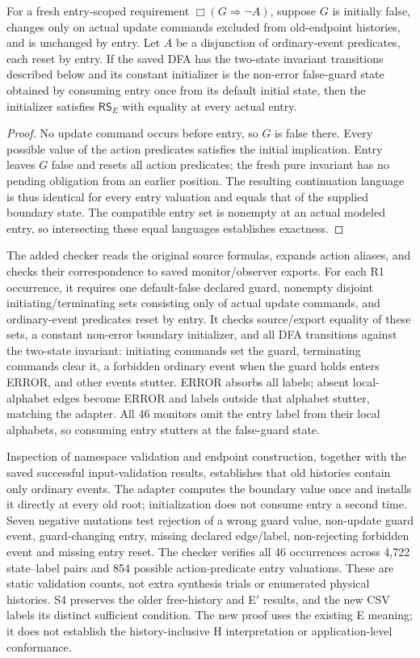 \begin{lemma}
\label{lem:r1-entry}
For a fresh entry-scoped requirement $\Box(G\Rightarrow\neg A)$, suppose $G$ is initially false, changes only on actual update commands excluded from old-endpoint histories, and is unchanged by entry. Let $A$ be a disjunction of ordinary-event predicates, each reset by entry. If the saved DFA has the two-state invariant transitions described below and its constant initializer is the non-error false-guard state obtained by consuming entry once from its default initial state, then the initializer satisfies $\mathsf{RS}_E$ with equality at every actual entry.
\end{lemma}
\begin{proof}
No update command occurs before entry, so $G$ is false there. Every possible value of the action predicates satisfies the initial implication. Entry leaves $G$ false and resets all action predicates; the fresh pure invariant has no pending obligation from an earlier position. The resulting continuation language is thus identical for every entry valuation and equals that of the supplied boundary state. The compatible entry set is nonempty at an actual modeled entry, so intersecting these equal languages establishes exactness.
\end{proof}

The added checker reads the original source formulas, expands action aliases, and checks their correspondence to saved monitor/observer exports. For each R1 occurrence, it requires one default-false declared guard, nonempty disjoint initiating/terminating sets consisting only of actual update commands, and ordinary-event predicates reset by entry. It checks source/export equality of these sets, a constant non-error boundary initializer, and all DFA transitions against the two-state invariant: initiating commands set the guard, terminating commands clear it, a forbidden ordinary event when the guard holds enters ERROR, and other events stutter. ERROR absorbs all labels; absent local-alphabet edges become ERROR and labels outside that alphabet stutter, matching the adapter. All 46 monitors omit the entry label from their local alphabets, so consuming entry stutters at the false-guard state.

Inspection of namespace validation and endpoint construction, together with the saved successful input-validation results, establishes that old histories contain only ordinary events. The adapter computes the boundary value once and installs it directly at every old root; initialization does not consume entry a second time. Seven negative mutations test rejection of a wrong guard value, non-update guard event, guard-changing entry, missing declared edge/label, non-rejecting forbidden event and missing entry reset. The checker verifies all 46 occurrences across 4,722 state--label pairs and 854 possible action-predicate entry valuations. These are static validation counts, not extra synthesis trials or enumerated physical histories. S4 preserves the older free-history and E$'$ results, and the new CSV labels its distinct sufficient condition. The new proof uses the existing E meaning; it does not establish the history-inclusive H interpretation or application-level conformance.

